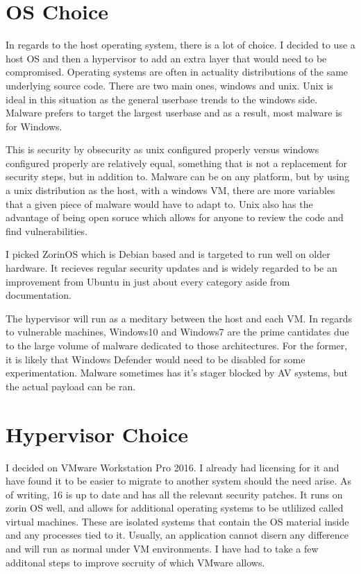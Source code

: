 \section{OS Choice}
In regards to the host operating system, there is a lot of choice. I decided to use a host OS and then a hypervisor to add an extra layer that would need to be compromised. Operating systems are often in actuality distributions of the same underlying source code. There are two main ones, windows and unix. Unix is ideal in this situation as the general userbase trends to the windows side. Malware prefers to target the largest userbase and as a result, most malware is for Windows.

This is security by obsecurity as unix configured properly versus windows configured properly are relatively equal, something that is not a replacement for security steps, but in addition to. Malware can be on any platform, but by using a unix distribution as the host, with a windows VM, there are more variables that a given piece of malware would have to adapt to. Unix also has the advantage of being open soruce which allows for anyone to review the code and find vulnerabilities.

I picked ZorinOS which is Debian based and is targeted to run well on older hardware. It recieves regular security updates and is widely regarded to be an improvement from Ubuntu in just about every category aside from documentation.

The hypervisor will run as a meditary between the host and each VM. In regards to vulnerable machines, Windows10 and Windows7 are the prime cantidates due to the large volume of malware dedicated to those architectures. For the former, it is likely that Windows Defender would need to be disabled for some experimentation. Malware sometimes has it's stager blocked by AV systems, but the actual payload can be ran.

\section{Hypervisor Choice}
I decided on VMware Workstation Pro 2016. I already had licensing for it and have found it to be easier to migrate to another system should the need arise. As of writing, 16 is up to date and has all the relevant security patches. It runs on zorin OS well, and allows for additional operating systems to be utlilized called virtual machines.
These are isolated systems that contain the OS material inside and any processes tied to it. Usually, an application cannot disern any difference and will run as normal under VM environments. I have had to take a few additonal steps to improve secruity of which VMware allows.

